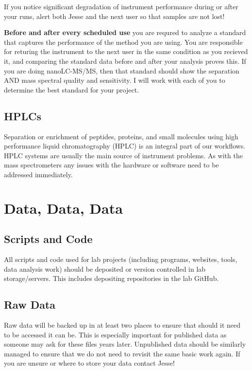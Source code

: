 \documentclass[
]{book}
\begin{document}
If you notice significant degradation of instrument performance during or after your runs, alert both Jesse and the next user so that samples are not lost!

\textbf{Before and after every scheduled use} you are requred to analyze a standard that captures the performance of the method you are using. You are responsible for returing the instrument to the next user in the same condition as you recieved it, and comparing the standard data before and after your analysis proves this. If you are doing nanoLC-MS/MS, then that standard should show the separation AND mass spectral quality and sensitivity. I will work with each of you to determine the best standard for your project.

\hypertarget{hplcs}{%
\subsection{HPLCs}\label{hplcs}}

Separation or enrichment of peptides, proteins, and small molecules using high performance liquid chromatography (HPLC) is an integral part of our workflows. HPLC systems are usually the main source of instrument problems. As with the mass spectrometers any issues with the hardware or software need to be addressed immediately.

\hypertarget{data-data-data}{%
\section{Data, Data, Data}\label{data-data-data}}

\hypertarget{scripts-and-code}{%
\subsection{Scripts and Code}\label{scripts-and-code}}

All scripts and code used for lab projects (including programs, websites, tools, data analysis work) should be deposited or version controlled in lab storage/servers. This includes depositing repositories in the lab GitHub.

\hypertarget{raw-data}{%
\subsection{Raw Data}\label{raw-data}}

Raw data will be backed up in at least two places to ensure that should it need to be accessed it can be. This is especially important for published data as someone may ask for these files years later. Unpublished data should be similarly managed to ensure that we do not need to revisit the same basic work again. If you are unsure or where to store your data contact Jesse!
\end{document}
